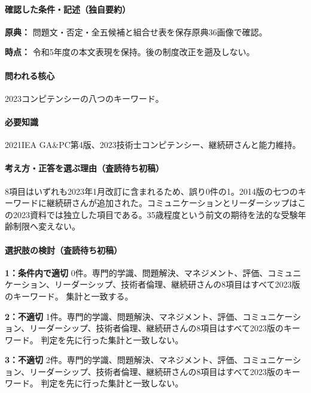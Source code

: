 \paragraph{確認した条件・記述（独自要約）}\mbox{}\par

\noindent\textbf{原典：} 問題文・否定・全五候補と組合せ表を保存原典36画像で確認。\par

\noindent\textbf{時点：} 令和5年度の本文表現を保持。後の制度改正を遡及しない。\par

\paragraph{問われる核心} 2023コンピテンシーの八つのキーワード。

\paragraph{必要知識} 2021IEA GA\&PC第4版、2023技術士コンピテンシー、継続研さんと能力維持。

\paragraph{考え方・正答を選ぶ理由（査読待ち初稿）} 8項目はいずれも2023年1月改訂に含まれるため、誤り0件の1。2014版の七つのキーワードに継続研さんが追加された。コミュニケーションとリーダーシップはこの2023資料では独立した項目である。35歳程度という前文の期待を法的な受験年齢制限へ変えない。

\paragraph{選択肢の検討（査読待ち初稿）}\mbox{}\par

\noindent\textbf{1：条件内で適切} 0件。専門的学識、問題解決、マネジメント、評価、コミュニケーション、リーダーシップ、技術者倫理、継続研さんの8項目はすべて2023版のキーワード。 集計と一致する。\par

\noindent\textbf{2：不適切} 1件。専門的学識、問題解決、マネジメント、評価、コミュニケーション、リーダーシップ、技術者倫理、継続研さんの8項目はすべて2023版のキーワード。 判定を先に行った集計と一致しない。\par

\noindent\textbf{3：不適切} 2件。専門的学識、問題解決、マネジメント、評価、コミュニケーション、リーダーシップ、技術者倫理、継続研さんの8項目はすべて2023版のキーワード。 判定を先に行った集計と一致しない。\par

